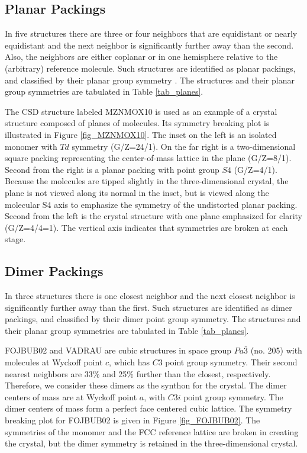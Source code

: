 \documentclass{iucr}              %
\begin{document}
\subsection{Planar Packings}

In five structures there are three or four neighbors that are equidistant or nearly equidistant and the next neighbor is significantly further away than the second.  Also, the neighbors are either coplanar or in one hemisphere relative to the (arbitrary) reference molecule.  Such structures are identified as planar packings, and classified by their planar group symmetry \cite{Hahn02}.  The structures and their planar group symmetries are tabulated in Table \ref{tab_planes}.  

The CSD structure labeled MZNMOX10 is used as an example of a crystal structure composed of planes of molecules.  Its symmetry breaking plot is illustrated in Figure \ref{fig_MZNMOX10}.  The inset on the left is an isolated monomer with $Td$ symmetry (G/Z=24/1).  On the far right is a two-dimensional square packing representing the center-of-mass lattice in the plane (G/Z=8/1).  Second from the right is a planar packing with point group $S4$ (G/Z=4/1).  Because the molecules are tipped slightly in the three-dimensional crystal, the plane is not viewed along its normal in the inset, but is viewed along the molecular S4 axis to emphasize the symmetry of the undistorted planar packing.  Second from the left is the crystal structure with one plane emphasized for clarity (G/Z=4/4=1).  The vertical axis indicates that symmetries are broken at each stage.

\subsection{Dimer Packings}

In three structures there is one closest neighbor and the next closest neighbor is significantly further away than the first.  Such structures are identified as dimer packings, and classified by their dimer point group symmetry.  The structures and their planar group symmetries are tabulated in Table \ref{tab_planes}.  

FOJBUB02 and VADRAU are cubic structures in space group $Pa\bar{3}$ (no. 205) with molecules at Wyckoff point $c$, which has $C3$ point group symmetry.  Their second nearest neighbors are 33\% and 25\% further than the closest, respectively.  Therefore, we consider these dimers as the synthon for the crystal.  The dimer centers of mass are at Wyckoff point $a$, with $C3i$ point group symmetry.  The dimer centers of mass form a perfect face centered cubic lattice.  The symmetry breaking plot for FOJBUB02 is given in Figure \ref{fig_FOJBUB02}.  The symmetries of the monomer and the FCC reference lattice are broken in creating the crystal, but the dimer symmetry is retained in the three-dimensional crystal.
\end{document}
